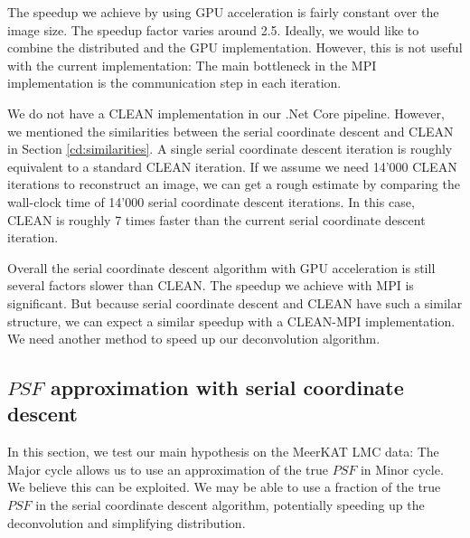 The speedup we achieve by using GPU acceleration is fairly constant over the image size. The speedup factor varies around 2.5. Ideally, we would like to combine the distributed and the GPU implementation. However, this is not useful with the current implementation: The main bottleneck in the MPI implementation is the communication step in each iteration. 

We do not have a CLEAN implementation in our .Net Core pipeline. However, we mentioned the similarities between the serial coordinate descent and CLEAN in Section \ref{cd:similarities}. A single serial coordinate descent iteration is roughly equivalent to a standard CLEAN iteration. If we assume we need 14'000 CLEAN iterations to reconstruct an image, we can get a rough estimate by comparing the wall-clock time of 14'000 serial coordinate descent iterations. In this case, CLEAN is roughly 7 times faster than the current serial coordinate descent iteration.

Overall the serial coordinate descent algorithm with GPU acceleration is still several factors slower than CLEAN. The speedup we achieve with MPI is significant. But because serial coordinate descent and CLEAN have such a similar structure, we can expect a similar speedup with a CLEAN-MPI implementation. We need another method to speed up our deconvolution algorithm.


\subsection{$PSF$ approximation with serial coordinate descent} \label{results:gradients}
In this section, we test our main hypothesis on the MeerKAT LMC data: The Major cycle allows us to use an approximation of the true $PSF$ in Minor cycle. We believe this can be exploited. We may be able to use a fraction of the true $PSF$ in the serial coordinate descent algorithm, potentially speeding up the deconvolution and simplifying distribution.


